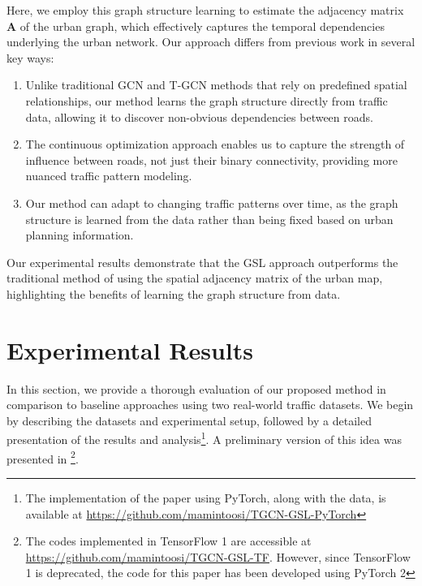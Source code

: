 \documentclass[pdflatex,sn-mathphys-num]{sn-jnl}%
\theoremstyle{thmstyleone}%
\theoremstyle{thmstyletwo}%
\theoremstyle{thmstylethree}%
\begin{document}
Here, we employ this graph structure learning to estimate the adjacency matrix $\mathbf{A}$ of the urban graph, which effectively captures the temporal dependencies underlying the urban network. Our approach differs from previous work in several key ways:

\begin{enumerate}
\item Unlike traditional GCN and T-GCN methods that rely on predefined spatial relationships, our method learns the graph structure directly from traffic data, allowing it to discover non-obvious dependencies between roads.
\item The continuous optimization approach enables us to capture the strength of influence between roads, not just their binary connectivity, providing more nuanced traffic pattern modeling.
\item Our method can adapt to changing traffic patterns over time, as the graph structure is learned from the data rather than being fixed based on urban planning information.
\end{enumerate}

Our experimental results demonstrate that the GSL approach outperforms the traditional method of using the spatial adjacency matrix of the urban map, highlighting the benefits of learning the graph structure from data. 
\section{Experimental Results}\label{sec:results}

In this section, we provide a thorough evaluation of our proposed method in comparison to baseline approaches using two real-world traffic datasets. We begin by describing the datasets and experimental setup, followed by a detailed presentation of the results and analysis\footnote{The implementation of the paper using PyTorch, along with the data, is available at \url{https://github.com/mamintoosi/TGCN-GSL-PyTorch}}.
A preliminary version of this idea was presented in \cite{Amintoosi1403aimc55-GSL}\footnote{The codes implemented in TensorFlow 1 are accessible at \url{https://github.com/mamintoosi/TGCN-GSL-TF}. However, since TensorFlow 1 is deprecated, the code for this paper has been developed using PyTorch 2}.
\end{document}

